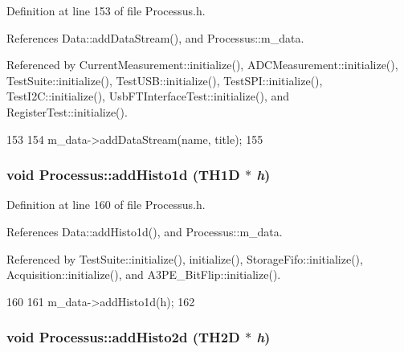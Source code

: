 Definition at line 153 of file Processus.h.

References Data::addDataStream(), and Processus::m\_\-data.

Referenced by CurrentMeasurement::initialize(), ADCMeasurement::initialize(), TestSuite::initialize(), TestUSB::initialize(), TestSPI::initialize(), TestI2C::initialize(), UsbFTInterfaceTest::initialize(), and RegisterTest::initialize().


\begin{DoxyCode}
153                                                        {
154     m_data->addDataStream(name, title);
155   }
\end{DoxyCode}
\hypertarget{classProcessus_ad46e0d4dfdfdcbce001ee6be1746dfa4}{
\subsubsection[{addHisto1d}]{\setlength{\rightskip}{0pt plus 5cm}void Processus::addHisto1d (TH1D $\ast$ {\em h})}}
\label{classProcessus_ad46e0d4dfdfdcbce001ee6be1746dfa4}


Definition at line 160 of file Processus.h.

References Data::addHisto1d(), and Processus::m\_\-data.

Referenced by TestSuite::initialize(), initialize(), StorageFifo::initialize(), Acquisition::initialize(), and A3PE\_\-BitFlip::initialize().


\begin{DoxyCode}
160                            {
161     m_data->addHisto1d(h);
162   }
\end{DoxyCode}
\hypertarget{classProcessus_ac1ed1aed5edaeabdf18aa56775440471}{
\subsubsection[{addHisto2d}]{\setlength{\rightskip}{0pt plus 5cm}void Processus::addHisto2d (TH2D $\ast$ {\em h})}}
\label{classProcessus_ac1ed1aed5edaeabdf18aa56775440471}


